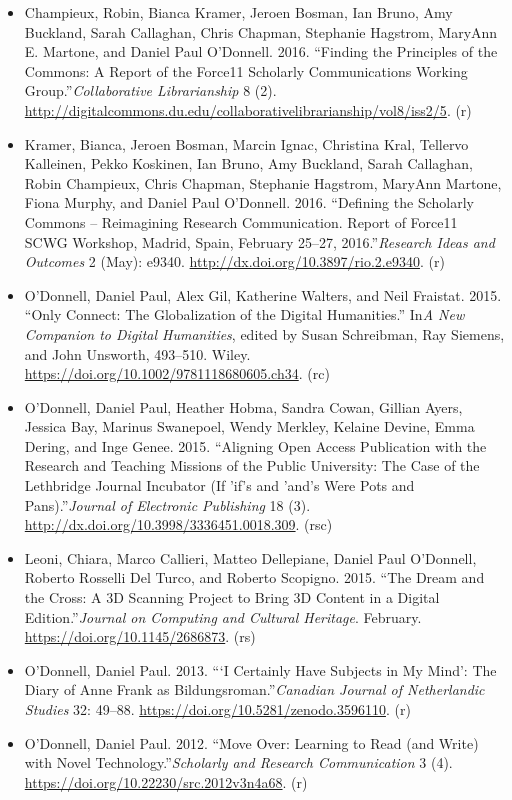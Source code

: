\documentclass[12pt]{article}
\begin{document}
\begin{itemize}
  \item Champieux, Robin, Bianca Kramer, Jeroen Bosman, Ian Bruno, Amy Buckland, Sarah Callaghan, Chris Chapman, Stephanie Hagstrom, MaryAnn E. Martone, and Daniel Paul O'Donnell. 2016. “Finding the Principles of the Commons: A Report of the Force11 Scholarly Communications Working Group.”\textit{Collaborative Librarianship} 8 (2). \url{http://digitalcommons.du.edu/collaborativelibrarianship/vol8/iss2/5}. (r)
  \item Kramer, Bianca, Jeroen Bosman, Marcin Ignac, Christina Kral, Tellervo Kalleinen, Pekko Koskinen, Ian Bruno, Amy Buckland, Sarah Callaghan, Robin Champieux, Chris Chapman, Stephanie Hagstrom, MaryAnn Martone, Fiona Murphy, and Daniel Paul O'Donnell. 2016. “Defining the Scholarly Commons – Reimagining Research Communication. Report of Force11 SCWG Workshop, Madrid, Spain, February 25–27, 2016.”\textit{Research Ideas and Outcomes} 2 (May): e9340. \url{http://dx.doi.org/10.3897/rio.2.e9340}. (r)
  \item O'Donnell, Daniel Paul, Alex Gil, Katherine Walters, and Neil Fraistat. 2015. “Only Connect: The Globalization of the Digital Humanities.” In\textit{A New Companion to Digital Humanities}, edited by Susan Schreibman, Ray Siemens, and John Unsworth, 493–510. Wiley. \url{https://doi.org/10.1002/9781118680605.ch34}. (rc)
  \item O'Donnell, Daniel Paul, Heather Hobma\*, Sandra Cowan, Gillian Ayers\*, Jessica Bay\*, Marinus Swanepoel, Wendy Merkley, Kelaine Devine\*, Emma Dering\*, and Inge Genee. 2015. “Aligning Open Access Publication with the Research and Teaching Missions of the Public University: The Case of the Lethbridge Journal Incubator (If 'if's and 'and's Were Pots and Pans).”\textit{Journal of Electronic Publishing} 18 (3). \url{http://dx.doi.org/10.3998/3336451.0018.309}. (rsc)
  \item Leoni, Chiara\*, Marco Callieri, Matteo Dellepiane, Daniel Paul O'Donnell, Roberto Rosselli Del Turco, and Roberto Scopigno. 2015. “The Dream and the Cross: A 3D Scanning Project to Bring 3D Content in a Digital Edition.”\textit{Journal on Computing and Cultural Heritage}. February. \url{https://doi.org/10.1145/2686873}. (rs)
  \item O'Donnell, Daniel Paul. 2013. “‘I Certainly Have Subjects in My Mind’: The Diary of Anne Frank as Bildungsroman.”\textit{Canadian Journal of Netherlandic Studies} 32: 49–88. \url{https://doi.org/10.5281/zenodo.3596110}. (r)
  \item O'Donnell, Daniel Paul. 2012. “Move Over: Learning to Read (and Write) with Novel Technology.”\textit{Scholarly and Research Communication} 3 (4). \url{https://doi.org/10.22230/src.2012v3n4a68}. (r)

\end{itemize}
\end{document}
